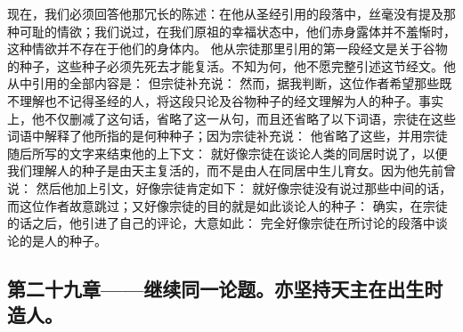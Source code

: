 现在，我们必须回答他那冗长的陈述：在他从圣经引用的段落中，丝毫没有提及那种可耻的情欲；我们说过，在我们原祖的幸福状态中，他们赤身露体并不羞惭时，这种情欲并不存在于他们的身体内。 他从宗徒那里引用的第一段经文是关于谷物的种子，这些种子必须先死去才能复活。不知为何，他不愿完整引述这节经文。他从中引用的全部内容是： 但宗徒补充说：  然而，据我判断，这位作者希望那些既不理解也不记得圣经的人，将这段只论及谷物种子的经文理解为人的种子。事实上，他不仅删减了这句话，省略了这一从句，而且还省略了以下词语，宗徒在这些词语中解释了他所指的是何种种子；因为宗徒补充说：  他省略了这些，并用宗徒随后所写的文字来结束他的上下文： 就好像宗徒在谈论人类的同居时说了，以便我们理解人的种子是由天主复活的，而不是由人在同居中生儿育女。因为他先前曾说： 然后他加上引文，好像宗徒肯定如下： 就好像宗徒没有说过那些中间的话，而这位作者故意跳过；又好像宗徒的目的就是如此谈论人的种子： 确实，在宗徒的话之后，他引进了自己的评论，大意如此： 完全好像宗徒在所讨论的段落中谈论的是人的种子。\par


\subsection{第二十九章——继续同一论题。亦坚持天主在出生时造人。}

